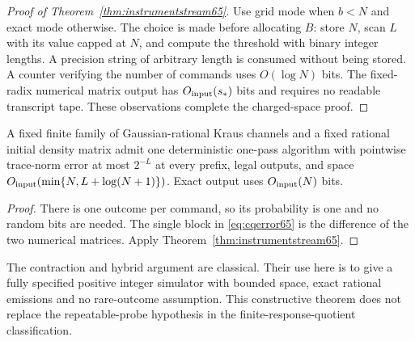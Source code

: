 \begin{proof}[Proof of Theorem~\ref{thm:instrumentstream65}]
Use grid mode when $b<N$ and exact mode otherwise. The choice is made
before allocating $B$: store $N$, scan $L$ with its value capped at
$N$, and compute the threshold with binary integer lengths. A
precision string of arbitrary length is consumed without being stored.
A counter verifying the number of commands uses $O(\log N)$ bits.
The fixed-radix numerical matrix output has
$O_{\rm input}(s_*)$ bits and requires no readable transcript tape.
These observations complete the charged-space proof.
\end{proof}

\begin{corollary}
\label{cor:channelstream65}
A fixed finite family of Gaussian-rational Kraus channels and a fixed
rational initial density matrix admit one deterministic one-pass
algorithm with pointwise trace-norm error at most $2^{-L}$ at every
prefix, legal outputs, and space
$O_{\rm input}(\min\{N,L+\log(N+1)\})$. Exact output uses
$O_{\rm input}(N)$ bits.
\end{corollary}
\begin{proof}
There is one outcome per command, so its probability is one and no
random bits are needed. The single block in
\eqref{eq:cqerror65} is the difference of the two numerical matrices.
Apply Theorem~\ref{thm:instrumentstream65}.
\end{proof}

The contraction and hybrid argument are classical. Their use here is
to give a fully specified positive integer simulator with bounded
space, exact rational emissions and no rare-outcome assumption.
This constructive theorem does not replace the repeatable-probe
hypothesis in the finite-response-quotient classification.
